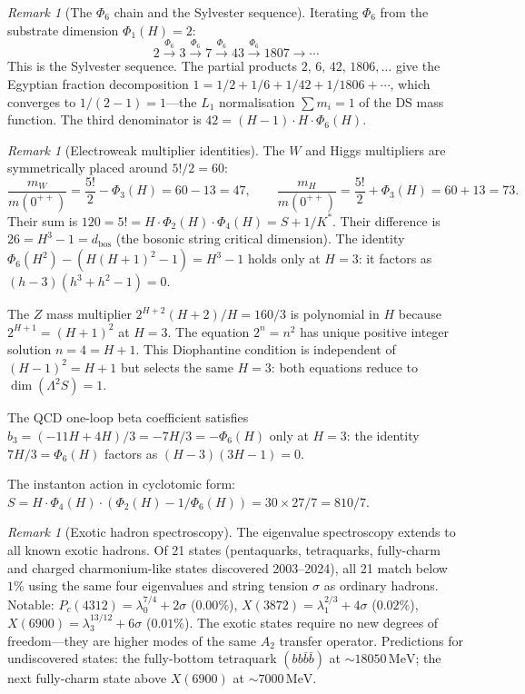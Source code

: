 \documentclass[11pt,a4paper]{article}
\theoremstyle{definition}
\theoremstyle{remark}
\newtheorem{remark}[theorem]{Remark}
\begin{document}
\begin{remark}[The $\Phi_6$ chain and the Sylvester sequence]\label{rem:sylvester}
Iterating $\Phi_6$ from the substrate dimension $\Phi_1(H)=2$:
\[
2\xrightarrow{\Phi_6}3\xrightarrow{\Phi_6}7\xrightarrow{\Phi_6}43\xrightarrow{\Phi_6}1807\to\cdots
\]
This is the Sylvester sequence. The partial products $2,\,6,\,42,\,1806,\ldots$ give the Egyptian fraction decomposition $1=1/2+1/6+1/42+1/1806+\cdots$, which converges to $1/(2-1)=1$---the $L_1$ normalisation $\sum m_i=1$ of the DS mass function. The third denominator is $42=(H-1)\cdot H\cdot\Phi_6(H)$.
\end{remark}

\begin{remark}[Electroweak multiplier identities]\label{rem:ew_identities}
The $W$ and Higgs multipliers are symmetrically placed around $5!/2=60$:
\begin{equation}\label{eq:WH_symmetric}
\frac{m_W}{m(0^{++})}=\frac{5!}{2}-\Phi_3(H)=60-13=47,\qquad\frac{m_H}{m(0^{++})}=\frac{5!}{2}+\Phi_3(H)=60+13=73.
\end{equation}
Their sum is $120=5!=H\cdot\Phi_2(H)\cdot\Phi_4(H)=S+1/K^*$. Their difference is $26=H^3-1=d_{\mathrm{bos}}$ (the bosonic string critical dimension). The identity $\Phi_6(H^2)-(H(H+1)^2-1)=H^3-1$ holds only at $H=3$: it factors as $(h-3)(h^3+h^2-1)=0$.

The $Z$ mass multiplier $2^{H+2}(H+2)/H=160/3$ is polynomial in $H$ because $2^{H+1}=(H+1)^2$ at $H=3$. The equation $2^n=n^2$ has unique positive integer solution $n=4=H+1$. This Diophantine condition is independent of $(H-1)^2=H+1$ but selects the same $H=3$: both equations reduce to $\dim(\Lambda^2 S)=1$.

The QCD one-loop beta coefficient satisfies $b_3=(-11H+4H)/3=-7H/3=-\Phi_6(H)$ only at $H=3$: the identity $7H/3=\Phi_6(H)$ factors as $(H-3)(3H-1)=0$.

The instanton action in cyclotomic form: $S=H\cdot\Phi_4(H)\cdot(\Phi_2(H)-1/\Phi_6(H))=30\times 27/7=810/7$.
\end{remark}

\begin{remark}[Exotic hadron spectroscopy]\label{rem:exotics}
The eigenvalue spectroscopy extends to all known exotic hadrons. Of 21 states (pentaquarks, tetraquarks, fully-charm and charged charmonium-like states discovered 2003--2024), all 21 match below $1\%$ using the same four eigenvalues and string tension $\sigma$ as ordinary hadrons. Notable: $P_c(4312)=\lambda_0^{7/4}+2\sigma$ ($0.00\%$), $X(3872)=\lambda_1^{2/3}+4\sigma$ ($0.02\%$), $X(6900)=\lambda_3^{13/12}+6\sigma$ ($0.01\%$). The exotic states require no new degrees of freedom---they are higher modes of the same $A_2$ transfer operator. Predictions for undiscovered states: the fully-bottom tetraquark $(bb\bar{b}\bar{b})$ at $\sim\!18050\,\mathrm{MeV}$; the next fully-charm state above $X(6900)$ at $\sim\!7000\,\mathrm{MeV}$.
\end{remark}
\end{document}
